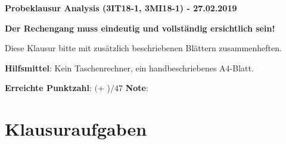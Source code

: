 \documentclass[11pt]{article}
\begin{document}
\thispagestyle{firstpage}

\begin{center}
{\bf {\large Probeklausur Analysis (3IT18-1, 3MI18-1) - 27.02.2019}}
\end{center}

\begin{center}
\textbf {Der Rechengang muss eindeutig und vollständig ersichtlich sein!}

Diese Klausur bitte mit zusätzlich beschriebenen Blättern zusammenheften.
\end{center}

\textbf{Hilfsmittel}: Kein Taschenrechner, ein handbeschriebenes A4-Blatt.

\textbf{Erreichte Punktzahl}: $($\space\space\space\space\space + \space\space\space\space\space)$/47$ \space\space\space\space\space \textbf{Note}:

\section*{Klausuraufgaben}
\end{document}
